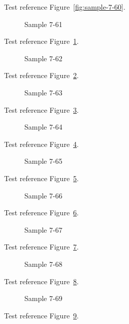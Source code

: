 Test reference Figure~\ref{fig:sample-7-60}.

\begin{figure}[tbhp]
\caption{Sample 7-61}
\label{fig:sample-7-61}
\end{figure}

Test reference Figure~\ref{fig:sample-7-61}.

\begin{figure}[tbhp]
\caption{Sample 7-62}
\label{fig:sample-7-62}
\end{figure}

Test reference Figure~\ref{fig:sample-7-62}.

\begin{figure}[tbhp]
\caption{Sample 7-63}
\label{fig:sample-7-63}
\end{figure}

Test reference Figure~\ref{fig:sample-7-63}.

\begin{figure}[tbhp]
\caption{Sample 7-64}
\label{fig:sample-7-64}
\end{figure}

Test reference Figure~\ref{fig:sample-7-64}.

\begin{figure}[tbhp]
\caption{Sample 7-65}
\label{fig:sample-7-65}
\end{figure}

Test reference Figure~\ref{fig:sample-7-65}.

\begin{figure}[tbhp]
\caption{Sample 7-66}
\label{fig:sample-7-66}
\end{figure}

Test reference Figure~\ref{fig:sample-7-66}.

\begin{figure}[tbhp]
\caption{Sample 7-67}
\label{fig:sample-7-67}
\end{figure}

Test reference Figure~\ref{fig:sample-7-67}.

\begin{figure}[tbhp]
\caption{Sample 7-68}
\label{fig:sample-7-68}
\end{figure}

Test reference Figure~\ref{fig:sample-7-68}.

\begin{figure}[tbhp]
\caption{Sample 7-69}
\label{fig:sample-7-69}
\end{figure}

Test reference Figure~\ref{fig:sample-7-69}.

